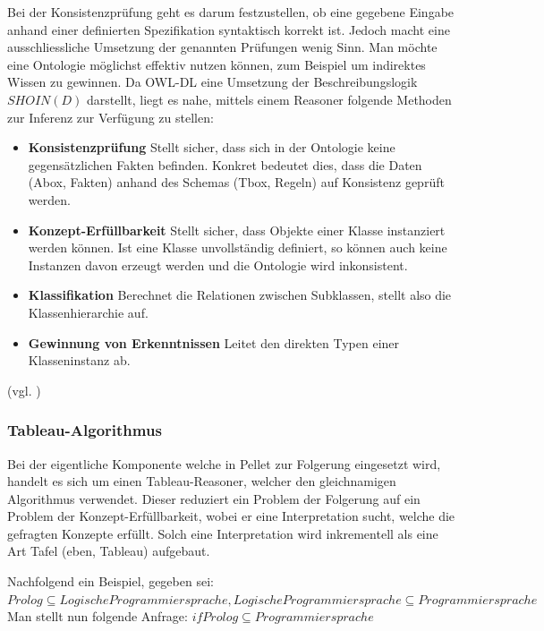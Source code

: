 Bei der Konsistenzprüfung geht es darum festzustellen, ob eine gegebene Eingabe anhand einer definierten Spezifikation syntaktisch korrekt ist. Jedoch macht eine ausschliessliche Umsetzung der genannten Prüfungen wenig Sinn. Man möchte eine Ontologie möglichst effektiv nutzen können, zum Beispiel um indirektes Wissen zu gewinnen.  Da OWL-DL eine Umsetzung der Beschreibungslogik $SHOIN (D)$ darstellt, liegt es nahe, mittels einem Reasoner folgende Methoden zur Inferenz zur Verfügung zu stellen:
\begin{itemize}

    \item \textbf{Konsistenzprüfung}
    Stellt sicher, dass sich in der Ontologie keine gegensätzlichen Fakten befinden. Konkret bedeutet dies, dass die Daten (Abox, Fakten) anhand des Schemas (Tbox, Regeln) auf Konsistenz geprüft werden.

    \item \textbf{Konzept-Erfüllbarkeit}
    Stellt sicher, dass Objekte einer Klasse instanziert werden können. Ist eine Klasse unvollständig definiert, so können auch keine Instanzen davon erzeugt werden und die Ontologie wird inkonsistent.

    \item \textbf{Klassifikation}
    Berechnet die Relationen zwischen Subklassen, stellt also die Klassenhierarchie auf.

    \item \textbf{Gewinnung von Erkenntnissen}
    Leitet den direkten Typen einer Klasseninstanz ab.

\end{itemize}
(vgl. \citet[S. 1 und 2]{sirin:pellet05})

\subsubsection{Tableau-Algorithmus}
\label{ssubsec:infres_pellet_tableau}
Bei der eigentliche Komponente welche in Pellet zur Folgerung eingesetzt wird, handelt es sich um einen Tableau-Reasoner, welcher den gleichnamigen Algorithmus verwendet. Dieser reduziert ein Problem der Folgerung auf ein Problem der Konzept-Erfüllbarkeit, wobei er eine Interpretation sucht, welche die gefragten Konzepte erfüllt. Solch eine Interpretation wird inkrementell als eine Art Tafel (eben, Tableau) aufgebaut.

Nachfolgend ein Beispiel, gegeben sei:
$ Prolog \subseteq LogischeProgrammiersprache, LogischeProgrammiersprache \subseteq Programmiersprache $
Man stellt nun folgende Anfrage:
$ if Prolog \subseteq Programmiersprache $

